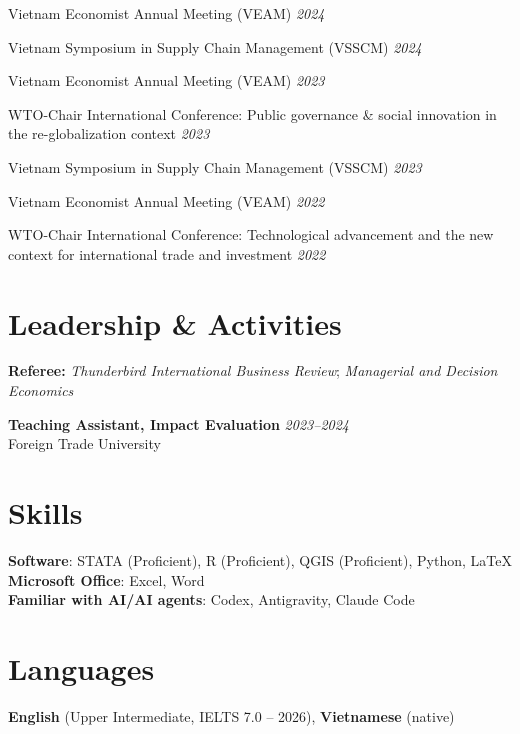 \documentclass[10.5pt]{article}
\begin{document}
\begin{enumerate}[label={[\arabic*]}]
\item Vietnam Economist Annual Meeting (VEAM) \hfill \emph{2024}
\item Vietnam Symposium in Supply Chain Management (VSSCM) \hfill \emph{2024}
\item Vietnam Economist Annual Meeting (VEAM) \hfill \emph{2023}
\item WTO-Chair International Conference: Public governance \& social innovation in the re-globalization context \hfill \emph{2023}
\item Vietnam Symposium in Supply Chain Management (VSSCM) \hfill \emph{2023}
\item Vietnam Economist Annual Meeting (VEAM) \hfill \emph{2022}
\item WTO-Chair International Conference: Technological advancement and the new context for international trade and investment \hfill \emph{2022}
\end{enumerate}

\section{Leadership \& Activities}

\textbf{Referee:} \textit{Thunderbird International Business Review}; \textit{Managerial and Decision Economics}

\textbf{Teaching Assistant, Impact Evaluation} \hfill \emph{2023--2024}\\
Foreign Trade University

\section{Skills}

\textbf{Software}: STATA (Proficient), R (Proficient), QGIS (Proficient), Python, \LaTeX\\
\textbf{Microsoft Office}: Excel, Word\\
\textbf{Familiar with AI/AI agents}: Codex, Antigravity, Claude Code

\section{Languages}

\textbf{English} (Upper Intermediate, IELTS 7.0 -- 2026), \textbf{Vietnamese} (native)
\end{document}
